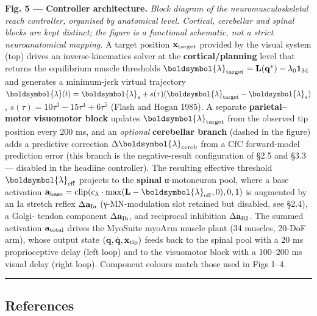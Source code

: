 \documentclass[
  11pt,
]{article}
\begin{document}
\textbf{Fig. 5 --- Controller architecture.} \emph{Block diagram of the
neuromusculoskeletal reach controller, organised by anatomical level.
Cortical, cerebellar and spinal blocks are kept distinct; the figure is
a functional schematic, not a strict neuroanatomical mapping.} A target
position \(\mathbf{x}_{\rm target}\) provided by the visual system (top)
drives an inverse-kinematics solver at the \textbf{cortical/planning}
level that returns the equilibrium muscle thresholds
\(\boldsymbol{\lambda}_{\rm target} = \mathbf{L}(\mathbf{q}^{*})- \lambda_{0}\mathbf{1}_{34}\)
and generates a minimum-jerk virtual trajectory
\(\boldsymbol{\lambda}(t) = \boldsymbol{\lambda}_{s} + s(\tau)(\boldsymbol{\lambda}_{\rm target}-\boldsymbol{\lambda}_{s})\),
\(s(\tau) = 10\tau^{3}-15\tau^{4}+6\tau^{5}\) (Flash and Hogan 1985). A
separate \textbf{parietal--motor visuomotor block} updates
\(\boldsymbol{\lambda}_{\rm target}\) from the observed tip position
every 200 ms, and an \emph{optional} \textbf{cerebellar branch} (dashed
in the figure) adds a predictive correction
\(\Delta\boldsymbol{\lambda}_{\rm cereb}\) from a CfC forward-model
prediction error (this branch is the negative-result configuration of
§2.5 and §3.3 --- disabled in the headline controller). The resulting
effective threshold \(\boldsymbol{\lambda}_{\rm eff}\) projects to the
\textbf{spinal} α-motoneuron pool, where a base activation
\(\mathbf{a}_{\rm base} = \mathrm{clip}(c_{\lambda}\cdot\max(\mathbf{L}-\boldsymbol{\lambda}_{\rm eff},0),0,1)\)
is augmented by an Ia stretch reflex \(\Delta\mathbf{a}_{\rm Ia}\)
(γ-MN-modulation slot retained but disabled, see §2.4), a Golgi- tendon
component \(\Delta\mathbf{a}_{\rm Ib}\), and reciprocal inhibition
\(\Delta\mathbf{a}_{\rm RI}\). The summed activation
\(\mathbf{a}_{\rm total}\) drives the MyoSuite myoArm muscle plant (34
muscles, 20-DoF arm), whose output state
\((\mathbf{q}, \dot{\mathbf{q}}, \mathbf{x}_{\rm tip})\) feeds back to
the spinal pool with a 20 ms proprioceptive delay (left loop) and to the
visuomotor block with a 100--200 ms visual delay (right loop). Component
colours match those used in Figs 1--4.

\begin{center}\rule{0.5\linewidth}{0.5pt}\end{center}

\hypertarget{references}{%
\subsection{References}\label{references}}
\end{document}
